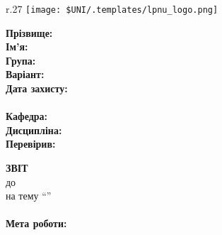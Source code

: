 \Margins
\begin{wrapfigure}[3]{r}{.27\textwidth}
\texttt{[image: \$UNI/.templates/lpnu\_logo.png]}
\end{wrapfigure}

\noindent\textbf{Прізвище:} \Lname \\
\noindent\textbf{Ім'я:} \Fname \\
\noindent\textbf{Група:} \Group \\
\noindent\textbf{Варіант:} \Variant \\
\noindent\textbf{Дата захисту:} \Date \\
\\
\noindent\textbf{Кафедра:} \Department \\
\noindent\textbf{Дисципліна:} \Discipline \\
\noindent\textbf{Перевірив:} \Instructor \\


\begin{center}
	\textbf{ЗВІТ}		\\
	до \Type~\No\Number	\\
	на тему ``\Topic''	\\
\end{center}
\paragraph{Мета роботи:}
